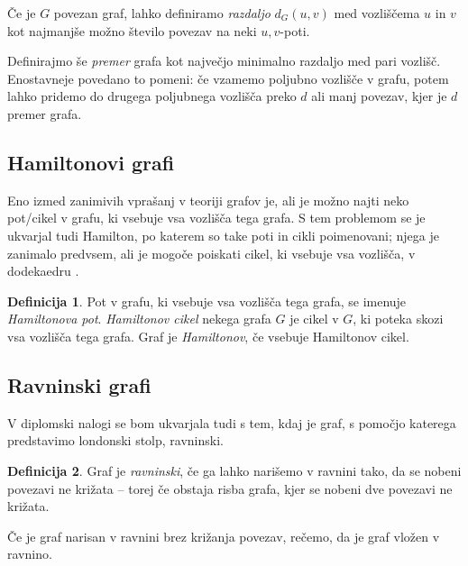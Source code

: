 \documentclass[12pt,a4paper]{amsart}
\theoremstyle{definition} %
\newtheorem{definicija}{Definicija}[section]
\theoremstyle{plain} %
\begin{document}
Če je $G$ povezan graf, lahko definiramo \emph{razdaljo} $d_G(u,v)$ med vozliščema $u$ in $v$ kot najmanjše možno število povezav na neki $u,v$-poti.

Definirajmo še \emph{premer} grafa kot največjo minimalno razdaljo med pari vozlišč. Enostavneje povedano to pomeni: če vzamemo poljubno vozlišče v grafu, potem lahko pridemo do drugega poljubnega vozlišča preko $d$ ali manj povezav, kjer je $d$ premer grafa.

\subsection{Hamiltonovi grafi}

Eno izmed zanimivih vprašanj v teoriji grafov je, ali je možno najti neko pot/cikel v grafu, ki vsebuje vsa vozlišča tega grafa. S tem problemom se je ukvarjal tudi Hamilton, po katerem so take poti in cikli poimenovani; njega je zanimalo predvsem, ali je mogoče poiskati cikel, ki vsebuje vsa vozlišča, v dodekaedru \cite{bib:wikihamilpath}.

\begin{definicija}
	Pot v grafu, ki vsebuje vsa vozlišča tega grafa, se imenuje \emph{Hamiltonova pot}.
	\emph{Hamiltonov cikel} nekega grafa $G$ je cikel v $G$, ki poteka skozi vsa vozlišča tega grafa.
	Graf je \emph{Hamiltonov}, če vsebuje Hamiltonov cikel.
\end{definicija}

\subsection{Ravninski grafi}

V diplomski nalogi se bom ukvarjala tudi s tem, kdaj je graf, s pomočjo katerega predstavimo londonski stolp, ravninski.

\begin{definicija}
    Graf je \emph{ravninski}, če ga lahko narišemo v ravnini tako, da se nobeni povezavi ne križata -- torej če obstaja risba grafa, kjer se nobeni dve povezavi ne križata.
\end{definicija}

Če je graf narisan v ravnini brez križanja povezav, rečemo, da je graf vložen v ravnino.
\end{document}
